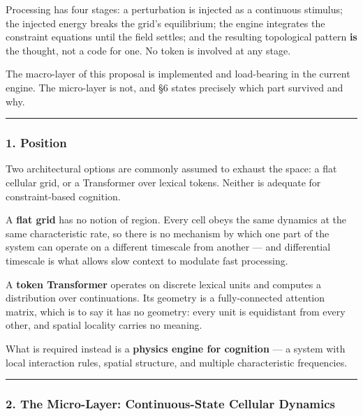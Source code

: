 \documentclass[
  11pt,
  a4paper,
]{article}
\begin{document}
Processing has four stages: a perturbation is injected as a continuous
stimulus; the injected energy breaks the grid's equilibrium; the engine
integrates the constraint equations until the field settles; and the
resulting topological pattern \textbf{is} the thought, not a code for
one. No token is involved at any stage.

The macro-layer of this proposal is implemented and load-bearing in the
current engine. The micro-layer is not, and §6 states precisely which
part survived and why.

\begin{center}\rule{0.5\linewidth}{0.5pt}\end{center}

\subsubsection{1. Position}\label{position}

Two architectural options are commonly assumed to exhaust the space: a
flat cellular grid, or a Transformer over lexical tokens. Neither is
adequate for constraint-based cognition.

A \textbf{flat grid} has no notion of region. Every cell obeys the same
dynamics at the same characteristic rate, so there is no mechanism by
which one part of the system can operate on a different timescale from
another --- and differential timescale is what allows slow context to
modulate fast processing.

A \textbf{token Transformer} operates on discrete lexical units and
computes a distribution over continuations. Its geometry is a
fully-connected attention matrix, which is to say it has no geometry:
every unit is equidistant from every other, and spatial locality carries
no meaning.

What is required instead is a \textbf{physics engine for cognition} ---
a system with local interaction rules, spatial structure, and multiple
characteristic frequencies.

\begin{center}\rule{0.5\linewidth}{0.5pt}\end{center}

\subsubsection{2. The Micro-Layer: Continuous-State Cellular
Dynamics}\label{the-micro-layer-continuous-state-cellular-dynamics}
\end{document}
